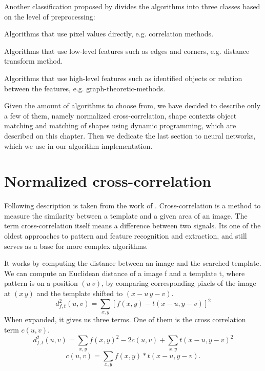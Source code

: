 Another classification proposed by \citet{distanceTransform} divides the algorithms into three classes based on the level of preprocessing:
\begin{description}
\item Algorithms that use pixel values directly, e.g. correlation methods.
\item Algorithms that use low-level features such as edges and corners, e.g. distance transform method.
\item Algorithms that use high-level features such as identified objects or relation between the features, e.g. graph-theoretic-methods.
\end{description}

Given the amount of algorithms to choose from, we have decided to describe only a few of them, namely normalized cross-correlation, shape contexts object matching and matching of shapes using dynamic programming, which are described on this chapter. Then we dedicate the last section to neural networks, which we use in our algorithm implementation.

\section{Normalized cross-correlation}
Following description is taken from the work of \cite{crossCorrLewis}.
Cross-correlation is a method to measure the similarity between a template and a given area of an image. The term cross-correlation itself means a difference between two signals. Its one of the oldest approaches to pattern and feature recognition and extraction, and still serves as a base for more complex algorithms.

It works by computing the distance between an image and the searched template. We can compute an Euclidean distance of a image f and a template t, where pattern is on a position $(u\,v)$, by comparing corresponding pixels of the image at $(x\,y)$ and the template shifted to $(x-u\,y-v)$. 
\begin{equation*}
d_{f,t}^{2}(u,v)=\sum_{x,y} [ f(x,y) - t(x-u, y-v) ]^{2} 
\end{equation*}
When expanded, it gives us three terms. One of them is the cross correlation term $c(u,v)$.
\begin{equation*}
d_{f,t}^{2}(u,v)=\sum_{x,y} f(x,y)^{2} - 2c(u,v) + \sum_{x,y} t(x-u, y-v)^2
\end{equation*}
\begin{equation*}
c(u,v)=\sum_{x,y} f(x,y) * t(x-u, y-v).
\end{equation*}


